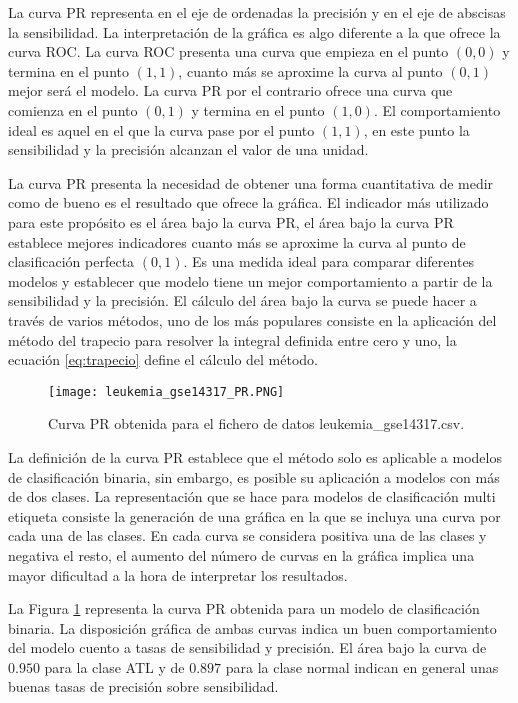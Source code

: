 \bigbreak


La curva PR representa en el eje de ordenadas la precisión y en el eje de abscisas la sensibilidad. La interpretación de la gráfica es algo diferente a la que ofrece la curva ROC. La curva ROC presenta una curva que empieza en el punto $(0, 0)$ y termina en el punto $(1, 1)$, cuanto más se aproxime la curva al punto $(0, 1)$ mejor será el modelo. La curva PR por el contrario ofrece una curva que comienza en el punto $(0, 1)$ y termina en el punto $(1, 0)$. El comportamiento ideal es aquel en el que la curva pase por el punto $(1, 1)$, en este punto la sensibilidad y la precisión alcanzan el valor de una unidad.

\bigbreak

La curva PR presenta la necesidad de obtener una forma cuantitativa de medir como de bueno es el resultado que ofrece la gráfica. El indicador más utilizado para este propósito es el área bajo la curva PR, el área bajo la curva PR establece mejores indicadores cuanto más se aproxime la curva al punto de clasificación perfecta $(0, 1)$. Es una medida ideal para comparar diferentes modelos y establecer que modelo tiene un mejor comportamiento a partir de la sensibilidad y la precisión. El cálculo del área bajo la curva se puede hacer a través de varios métodos, uno de los más populares consiste en la aplicación del método del trapecio para resolver la integral definida entre cero y uno, la ecuación \ref{eq:trapecio} define el cálculo del método.

\bigbreak

\begin{figure}[htp]
    \centering
    \texttt{[image: leukemia\_gse14317\_PR.PNG]}
    \caption{Curva PR obtenida para el fichero de datos leukemia\_gse14317.csv.}
    \label{fig:6}
\end{figure}

La definición de la curva PR establece que el método solo es aplicable a modelos de clasificación binaria, sin embargo, es posible su aplicación a modelos con más de dos clases. La representación que se hace para modelos de clasificación multi etiqueta consiste la generación de una gráfica en la que se incluya una curva por cada una de las clases. En cada curva se considera positiva una de las clases y negativa el resto, el aumento del número de curvas en la gráfica implica una mayor dificultad a la hora de interpretar los resultados.

\bigbreak

La Figura \ref{fig:6} representa la curva PR obtenida para un modelo de clasificación binaria. La disposición gráfica de ambas curvas indica un buen comportamiento del modelo cuento a tasas de sensibilidad y precisión. El área bajo la curva de $0.950$ para la clase ATL y de $0.897$ para la clase normal indican en general unas buenas tasas de precisión sobre sensibilidad.

\clearpage